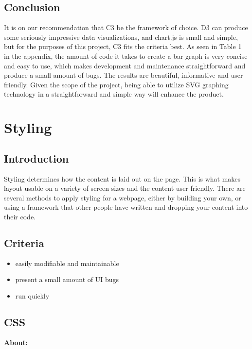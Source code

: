 \documentclass[draftclsnofoot,onecolumn,letterpaper,10pt,compsoc]{IEEEtran}
\begin{document}
  \subsection{Conclusion}

    It is on our recommendation that C3 be the framework of choice.
    D3 can produce some seriously impressive data visualizations, and chart.js is small and simple, but for the purposes of this project, C3 fits the criteria best.
    As seen in Table 1 in the appendix, the amount of code it takes to create a bar graph is very concise and easy to use, which makes development and maintenance straightforward and produce a small amount of bugs.
    The results are beautiful, informative and user friendly.
    Given the scope of the project, being able to utilize SVG graphing technology in a straightforward and simple way will enhance the product.

\section{Styling}

  \subsection{Introduction}

    Styling determines how the content is laid out on the page.
    This is what makes layout usable on a variety of screen sizes and the content user friendly.
    There are several methods to apply styling for a webpage, either by building your own, or using a framework that other people have written and dropping your content into their code.

  \subsection{Criteria}
  \begin{itemize}
    \item easily modifiable and maintainable
    \item present a small amount of UI bugs
    \item run quickly
  \end{itemize}

  \subsection{CSS}

    \textbf{About:}
\end{document}
